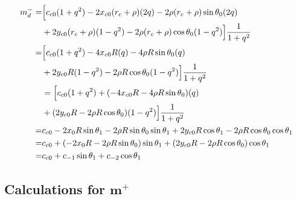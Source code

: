 \documentclass[12pt]{article}
\begin{document}
\begin{align}
    m_d^- =& \Bigl[ c_{c0}(1 + q^2) - 2x_{c0}(r_c+\rho)(2q) - 2\rho(r_c+\rho)\sin\theta_0(2q) \nonumber\\
    &+ 2y_{c0}(r_c+\rho)(1-q^2) - 2\rho(r_c+\rho)\cos\theta_0(1 - q^2) \Bigr] \frac{1}{1+q^2}\\
    =& \Bigl[ c_{c0}(1 + q^2) - 4x_{c0}R(q) - 4\rho R\sin\theta_0(q) \nonumber\\
    &+ 2y_{c0}R(1-q^2) - 2\rho R\cos\theta_0(1 - q^2) \Bigr] \frac{1}{1+q^2}\\
    &= \Bigl[ c_{c0}(1 + q^2) + (- 4x_{c0}R - 4\rho R\sin\theta_0)(q) \nonumber\\
    &+ (2y_{c0}R - 2\rho R\cos\theta_0)(1 - q^2) \Bigr] \frac{1}{1+q^2}\\
    =& c_{c0} - 2x_0R\sin\theta_1 - 2\rho R\sin\theta_0\sin\theta_1 + 2y_{c0}R\cos\theta_1 -2\rho R\cos\theta_0\cos\theta_1\\
    =& c_{c0} +(- 2x_0R - 2\rho R\sin\theta_0)\sin\theta_1 + (2y_{c0}R -2\rho R\cos\theta_0)\cos\theta_1\\
    =& c_{c0} +c_{-1}\sin\theta_1 + c_{-2}\cos\theta_1
\end{align}

\subsection{Calculations for $\mathbf{m^+}$}
\end{document}
